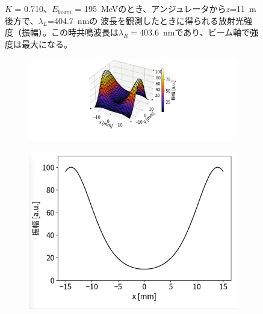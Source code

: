 \documentclass[a4paper,11pt,uplatex]{jsbook}
\begin{document}
\begin{figure}[h]
\begin{subfigure}[h]{0.35\linewidth}
  \end{subfigure}
\caption[共鳴波長でのアンジュレータ放射]{$K$ = 0.710、$E_{beam}$ = 195~MeVのとき、アンジュレータから$z$=11~m後方で、$\lambda_L$=404.7~nmの
波長を観測したときに得られる放射光強度（振幅）。この時共鳴波長は$\lambda_R = 403.6$~nmであり、ビーム軸で強度は最大になる。}\label{fig:resonance}
\end{figure}

\begin{figure}[h]
  \centering
  \begin{subfigure}[h]{\linewidth}
    \centering
    \includegraphics[width=0.8\linewidth]{image/2-spe_nores.png}
  \end{subfigure}
  \hfill
  \vspace{1em}
  \begin{subfigure}[h]{0.35\linewidth}
    \centering
    \includegraphics[width=\linewidth]{image/2-spe_nores_x.png}
  \end{subfigure}
  \hfill
  \begin{subfigure}[h]{0.35\linewidth}
    \centering

\end{subfigure}
\end{figure}
\end{document}
